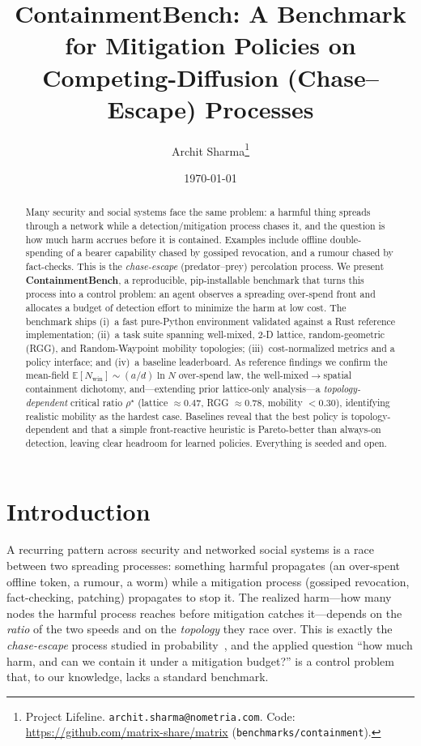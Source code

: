 \documentclass[11pt]{article}
\title{\textbf{ContainmentBench: A Benchmark for Mitigation Policies on
Competing-Diffusion (Chase--Escape) Processes}}
\author{Archit Sharma\thanks{Project Lifeline. \texttt{archit.sharma@nometria.com}.
Code: \url{https://github.com/matrix-share/matrix} (\texttt{benchmarks/containment}).}}
\date{\today}
\newcommand{\Nwin}{N_{\mathrm{win}}}
\newcommand{\rhoc}{\rho^\star}
\begin{document}
\maketitle

\begin{abstract}
Many security and social systems face the same problem: a harmful thing spreads
through a network while a detection/mitigation process chases it, and the question
is how much harm accrues before it is contained. Examples include offline
double-spending of a bearer capability chased by gossiped revocation, and a rumour
chased by fact-checks. This is the \emph{chase-escape} (predator--prey) percolation
process. We present \textbf{ContainmentBench}, a reproducible, pip-installable
benchmark that turns this process into a control problem: an agent observes a
spreading over-spend front and allocates a budget of detection effort to minimize
the harm at low cost. The benchmark ships (i)~a fast pure-Python environment
validated against a Rust reference implementation; (ii)~a task suite spanning
well-mixed, 2-D lattice, random-geometric (RGG), and Random-Waypoint mobility
topologies; (iii)~cost-normalized metrics and a policy interface; and (iv)~a
baseline leaderboard. As reference findings we confirm the mean-field
$\mathbb{E}[\Nwin]\!\sim\!(a/d)\ln N$ over-spend law, the well-mixed$\to$spatial
containment dichotomy, and---extending prior lattice-only analysis---a
\emph{topology-dependent} critical ratio $\rhoc$ (lattice $\approx0.47$, RGG
$\approx0.78$, mobility $<0.30$), identifying realistic mobility as the hardest
case. Baselines reveal that the best policy is topology-dependent and that a simple
front-reactive heuristic is Pareto-better than always-on detection, leaving clear
headroom for learned policies. Everything is seeded and open.
\end{abstract}

\section{Introduction}
A recurring pattern across security and networked social systems is a race between
two spreading processes: something harmful propagates (an over-spent offline token,
a rumour, a worm) while a mitigation process (gossiped revocation, fact-checking,
patching) propagates to stop it. The realized harm---how many nodes the harmful
process reaches before mitigation catches it---depends on the \emph{ratio} of the
two speeds and on the \emph{topology} they race over. This is exactly the
\emph{chase-escape} process studied in probability~\cite{chaseescape}, and the
applied question ``how much harm, and can we contain it under a mitigation budget?''
is a control problem that, to our knowledge, lacks a standard benchmark.
\end{document}
